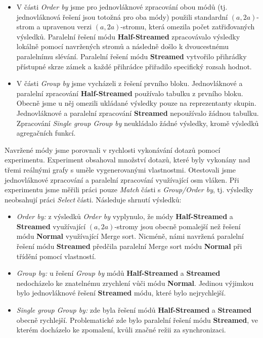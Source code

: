 \begin{enumerate}
\begin{itemize}
\item V části \textit{Order by} jsme pro jednovláknové zpracování obou módů (tj. jednovláknová řešení jsou totožná pro oba módy) použili standardní $(a, 2a)$-strom a upravenou verzi $(a, 2a)$-stromu, která omezila počet zatřiďovaných výsledků.  
Paralelní řešení módu \textbf{Half-Streamed} zpracovávalo výsledky lokálně pomocí navržených stromů a následně došlo k dvoucestnému paralelnímu slévání.
Paralelní řešení módu \textbf{Streamed} vytvořilo přihrádky přístupné skrze zámek a každé přihrádce přiřadilo specifický rozsah hodnot.

\item
V části \textit{Group by} jsme vycházeli z řešení prvního bloku.
Jednovláknové a paralelní zpracování \textbf{Half-Streamed} používalo tabulku z prvního bloku.
Obecně jsme u něj omezili ukládané výsledky pouze na reprezentanty skupin.
Jednovláknové a paralelní zpracování \textbf{Streamed} nepoužívalo žádnou tabulku.
Zpracování \textit{Single group Group by} neukládalo žádné výsledky, kromě výsledků agregačních funkcí.
\end{itemize}
\end{enumerate}

Navržené módy jsme porovnali v rychlosti vykonávání dotazů pomocí experimentu.
Experiment obsahoval množství dotazů, které byly vykonány nad třemi reálnými grafy s uměle vygenerovanými vlastnostmi.
Otestovali jsme jednovláknové zpracování a paralelní zpracování využívající osm vláken.
Při experimentu jsme měřili práci pouze \textit{Match} části s \textit{Group/Order by}, tj. výsledky neobsahují práci \textit{Select} části.
Následuje shrnutí výsledků:
\begin{itemize}

\item \textit{Order by:} z výsledků \textit{Order by} vyplynulo, že módy \textbf{Half-Streamed} a \textbf{Streamed} využívající $(a, 2a)$-stromy jsou obecně pomalejší než řešení módu \textbf{Normal} využívající Merge sort.
Nicméně, námi navržená paralelní řešení módu \textbf{Streamed} předčila paralelní Merge sort módu \textbf{Normal} při třídění pomocí vlastností.

\item \textit{Group by:} u řešení \textit{Group by} módů \textbf{Half-Streamed} a \textbf{Streamed} nedocházelo ke znatelnému zrychlení vůči módu \textbf{Normal}.
Jedinou výjimkou bylo jednovláknové řešení \textbf{Streamed} módu, které bylo nejrychlejší.

\item \textit{Single group Group by:} zde byla řešení módů \textbf{Half-Streamed} a \textbf{Streamed} obecně rychlejší.
Problematické zde bylo paralelní řešení módu \textbf{Streamed}, ve kterém docházelo ke zpomalení, kvůli značné režii za synchronizaci.

\end{itemize}

